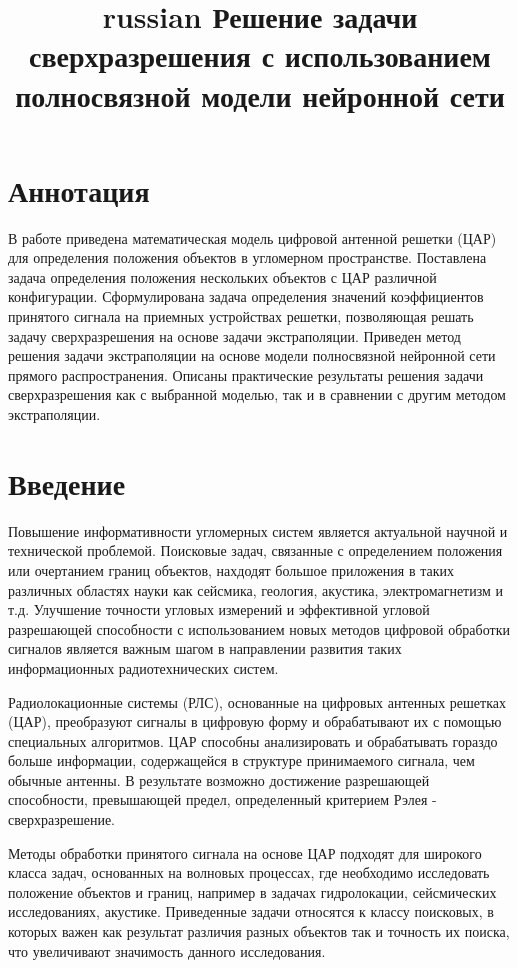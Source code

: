 \documentclass{article}
\title{\begin{otherlanguage*}{russian}
		\textbf{Решение задачи сверхразрешения с использованием полносвязной модели нейронной сети}
\end{otherlanguage*}}
\begin{document}
	
	\maketitle
	
	\section*{Аннотация}
	В работе приведена математическая модель цифровой антенной решетки (ЦАР) для определения положения объектов в угломерном пространстве. Поставлена задача определения положения нескольких объектов с ЦАР различной конфигурации. Сформулирована задача определения значений коэффициентов принятого сигнала на приемных устройствах решетки, позволяющая решать задачу сверхразрешения на основе задачи экстраполяции. Приведен метод решения задачи экстраполяции на основе модели полносвязной нейронной сети прямого распространения. Описаны практические результаты решения задачи сверхразрешения как с выбранной моделью, так и в сравнении с другим методом экстраполяции.
	
	\section*{Введение}
	Повышение информативности угломерных систем является актуальной научной и технической проблемой. Поисковые задач, связанные с определением положения или очертанием границ объектов, нахдодят большое приложения в таких различных областях науки как сейсмика, геология, акустика, электромагнетизм и т.д. Улучшение точности угловых измерений и эффективной угловой разрешающей способности с использованием новых методов цифровой обработки сигналов является важным шагом в направлении развития таких информационных радиотехнических систем.
		
	Радиолокационные системы (РЛС), основанные на цифровых антенных решетках (ЦАР), преобразуют сигналы в цифровую форму и обрабатывают их с помощью специальных алгоритмов. ЦАР способны анализировать и обрабатывать гораздо больше информации, содержащейся в структуре принимаемого сигнала, чем обычные антенны. В результате возможно достижение разрешающей способности, превышающей предел, определенный критерием Рэлея - сверхразрешение.
	
	Методы обработки принятого сигнала на основе ЦАР подходят для широкого класса задач, основанных на волновых процессах, где необходимо исследовать положение объектов и границ, например в задачах гидролокации, сейсмических исследованиях, акустике. Приведенные задачи относятся к классу поисковых, в которых важен как результат различия разных объектов так и точность их поиска, что увеличивают значимость данного исследования.
	
\end{document}
